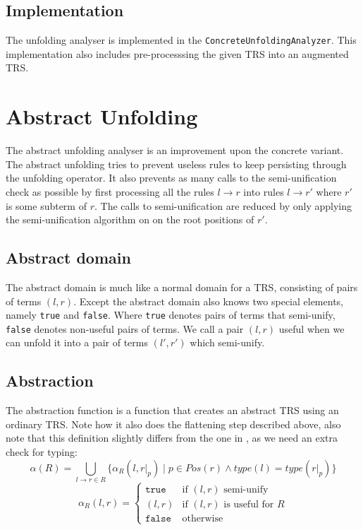 \subsection{Implementation}
The unfolding analyser is implemented in the \texttt{ConcreteUnfoldingAnalyzer}. This implementation also includes pre-processsing the given TRS into an augmented TRS.  

\section{Abstract Unfolding}
The abstract unfolding analyser is an improvement upon the concrete variant. The abstract unfolding tries to prevent useless rules to keep persisting through the unfolding operator. It also prevents as many calls to the semi-unification check as possible by first processing all the rules $l \rightarrow r$ into rules $l \rightarrow r'$ where $r'$ is some subterm of $r$. The calls to semi-unification are reduced by only applying the semi-unification algorithm on on the root positions of $r'$. 
\subsection*{Abstract domain}
The abstract domain is much like a normal domain for a TRS, consisting of pairs of terms $(l, r)$. Except the abstract domain also knows two special elements, namely \texttt{true} and \texttt{false}. Where \texttt{true} denotes pairs of terms that semi-unify, \texttt{false} denotes non-useful pairs of terms. We call a pair $(l, r)$ useful when we can unfold it into a pair of terms $(l', r')$ which semi-unify. 
\subsection*{Abstraction}
The abstraction function is a function that creates an abstract TRS using an ordinary TRS. Note how it also does the flattening step described above, also note that this definition slightly differs from the one in \cite{Payet:Unfolding}, as we need an extra check for typing: 
\[
\alpha(R) = \bigcup\limits_{l \rightarrow r \in R} \{\alpha_R(l, \left.r\right|_p) \mid p \in \textit{Pos}(r) \land \textit{type}(l) = \textit{type}(\left.r\right|_p)\} 
\]
\[
\alpha_R(l, r) =
\left\{
    \begin{array}{ll}
        \texttt{true} & \text{if } (l, r) \text{ semi-unify}\\
        (l, r) & \text{if } (l, r) \text{ is useful for } R\\
        \texttt{false} & \text{otherwise}
    \end{array}
\right.
\]
